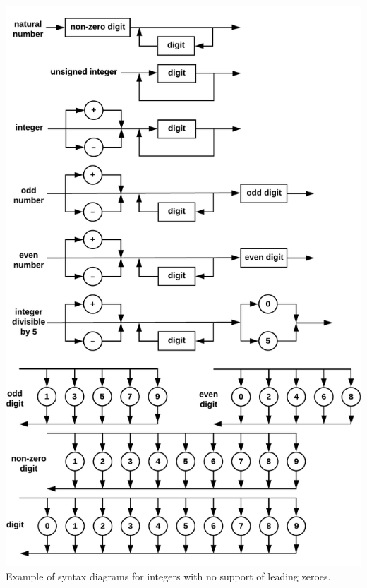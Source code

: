 \documentclass{article}
\begin{document}
		\includegraphics[width=\textwidth]{leadingzeroes4}
		\rmfamily
		Example of syntax diagrams for integers with no support of leading zeroes.
\end{document}
